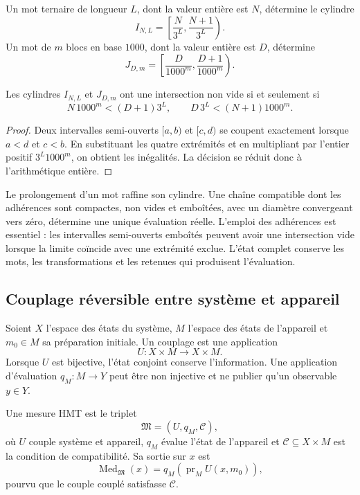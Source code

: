 Un mot ternaire de longueur \(L\), dont la valeur entière est \(N\), détermine
le cylindre
\[
 I_{N,L}=\left[\frac{N}{3^L},\frac{N+1}{3^L}\right).
\]
Un mot de \(m\) blocs en base \(1000\), dont la valeur entière est \(D\),
détermine
\[
 J_{D,m}=\left[\frac{D}{1000^m},\frac{D+1}{1000^m}\right).
\]

\begin{lemma}
Les cylindres \(I_{N,L}\) et \(J_{D,m}\) ont une intersection non vide si et
seulement si
\[
 N\,1000^m<(D+1)3^L,
 \qquad
 D\,3^L<(N+1)1000^m.
\]
\end{lemma}
\begin{proof}
Deux intervalles semi-ouverts \([a,b)\) et \([c,d)\) se coupent exactement
lorsque \(a<d\) et \(c<b\). En substituant les quatre extrémités et en multipliant
par l'entier positif \(3^L1000^m\), on obtient les inégalités. La
décision se réduit donc à l'arithmétique entière.
\end{proof}

Le prolongement d'un mot raffine son cylindre. Une chaîne compatible dont les
adhérences sont compactes, non vides et emboîtées, avec un diamètre convergeant vers zéro,
détermine une unique évaluation réelle. L'emploi des adhérences est essentiel :
les intervalles semi-ouverts emboîtés peuvent avoir une intersection vide lorsque la
limite coïncide avec une extrémité exclue. L'état complet conserve les
mots, les transformations et les retenues qui produisent l'évaluation.

\subsection{Couplage réversible entre système et appareil}

Soient \(X\) l'espace des états du système, \(M\) l'espace des états de
l'appareil et \(m_0\in M\) sa préparation initiale. Un couplage est une
application
\[
 U:X\times M\longrightarrow X\times M.
\]
Lorsque \(U\) est bijective, l'état conjoint conserve l'information. Une
application d'évaluation \(q_M:M\to Y\) peut être non injective et ne publier
qu'un observable \(y\in Y\).

\begin{definition}[Mesure]
Une mesure HMT est le triplet
\[
 \mathfrak M=(U,q_M,\mathcal C),
\]
où \(U\) couple système et appareil, \(q_M\) évalue l'état de l'appareil et
\(\mathcal C\subseteq X\times M\) est la condition de compatibilité. Sa
sortie sur \(x\) est
\[
 \operatorname{Med}_{\mathfrak M}(x)
 =q_M\!\left(\operatorname{pr}_M U(x,m_0)\right),
\]
pourvu que le couple couplé satisfasse \(\mathcal C\).
\end{definition}

